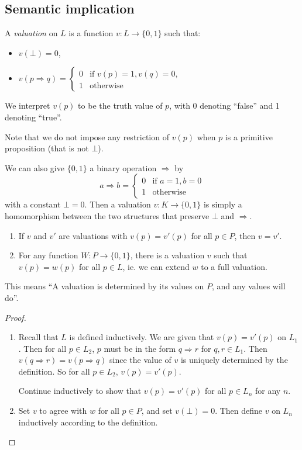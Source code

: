 \documentclass[a4paper]{article}
\begin{document}
\subsection{Semantic implication}
\begin{defi}[Valuation]
  A \emph{valuation} on $L$ is a function $v: L\to \{0, 1\}$ such that:
  \begin{itemize}
  \item $v(\bot) = 0$,
  \item $v(p\Rightarrow q) = \begin{cases} 0 & \text{if }v(p) = 1, v(q) = 0,\\1 & \text{otherwise}\end{cases}$
  \end{itemize}
  We interpret $v(p)$ to be the truth value of $p$, with 0 denoting ``false'' and 1 denoting ``true''.

  Note that we do not impose any restriction of $v(p)$ when $p$ is a primitive proposition (that is not $\bot$).
\end{defi}

We can also give $\{0, 1\}$ a binary operation $\Rightarrow$ by
\[
  a\Rightarrow b = \begin{cases}
    0 & \text{if }a = 1, b = 0\\
    1 & \text{otherwise}
  \end{cases}
\]
with a constant $\bot = 0$. Then a valuation $v: K\to \{0, 1\}$ is simply a homomorphism between the two structures that preserve $\bot$ and $\Rightarrow $.

\begin{prop}\leavevmode
  \begin{enumerate}
    \item If $v$ and $v'$ are valuations with $v(p) = v'(p)$ for all $p\in P$, then $v = v'$.
    \item For any function $W: P \to \{0, 1\}$, there is a valuation $v$ such that $v(p) = w(p)$ for all $p\in L$, ie. we can extend $w$ to a full valuation.
  \end{enumerate}
  This means ``A valuation is determined by its values on $P$, and any values will do''.
\end{prop}

\begin{proof}
  \begin{enumerate}
    \item Recall that $L$ is defined inductively. We are given that $v(p) = v'(p)$ on $L_1$. Then for all $p\in L_2$, $p$ must be in the form $q\Rightarrow r$ for $q, r\in L_1$. Then $v(q\Rightarrow r) = v(p\Rightarrow q)$ since the value of $v$ is uniquely determined by the definition. So for all $p\in L_2$, $v(p) = v'(p)$.

      Continue inductively to show that $v(p) = v'(p)$ for all $p\in L_n$ for any $n$.
    
    \item Set $v$ to agree with $w$ for all $p\in P$, and set $v(\bot) = 0$. Then define $v$ on $L_n$ inductively according to the definition.
  \end{enumerate}
\end{proof}
\end{document}
